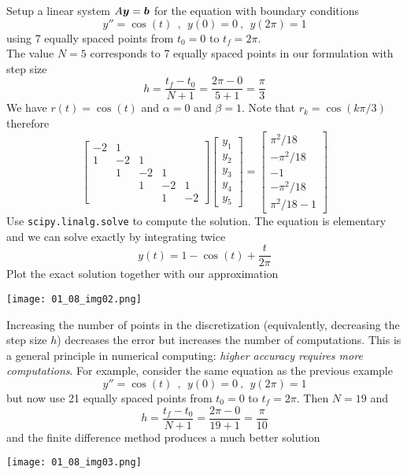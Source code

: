 \begin{example}
Setup a linear system $A \boldsymbol{y} = \boldsymbol{b}$ for the equation with boundary conditions
$$
y'' = \cos(t) \ \ , \ \ y(0) = 0 \ , \ \ y(2\pi) = 1
$$
using 7 equally spaced points from $t_0 = 0$ to $t_f = 2\pi$. \\

The value $N=5$ corresponds to 7 equally spaced points in our formulation with step size
$$
h = \frac{t_f - t_0}{N + 1} = \frac{2\pi - 0}{5 + 1} = \frac{\pi}{3}
$$
We have $r(t) = \cos(t)$ and $\alpha = 0$ and $\beta = 1$. Note that $r_k = \cos(k\pi/3)$ therefore
$$
\left[ \begin{array}{rrrrr}
-2 & 1 & & & \\
1 & -2 & 1 & & \\
& 1 & -2 & 1 & \\
& & 1 & -2 & 1 \\
& & & 1 & -2
\end{array} \right]
\begin{bmatrix} y_1 \\ y_2 \\ y_3 \\ y_4 \\ y_5 \end{bmatrix}
=
\begin{bmatrix} \pi^2/18 \\ -\pi^2/18 \\ -1 \\ -\pi^2/18 \\ \pi^2/18 - 1 \end{bmatrix}
$$
Use {\tt scipy.linalg.solve} to compute the solution. The equation is elementary and we can solve exactly by integrating twice
$$
y(t) = 1 - \cos(t) + \frac{t}{2 \pi}
$$
Plot the exact solution together with our approximation
\begin{center}
\texttt{[image: 01\_08\_img02.png]}
\end{center}
\end{example}

\begin{note}
Increasing the number of points in the discretization (equivalently, decreasing the step size $h$) decreases the error but increases the number of computations. This is a general principle in numerical computing: {\it higher accuracy requires more computations}. For example, consider the same equation as the previous example
$$
y'' = \cos(t) \ \ , \ \ y(0) = 0 \ , \ \ y(2\pi) = 1
$$
but now use 21 equally spaced points from $t_0 = 0$ to $t_f = 2\pi$. Then $N=19$ and
$$
h = \frac{t_f - t_0}{N + 1} = \frac{2\pi - 0}{19 + 1} = \frac{\pi}{10}
$$
and the finite difference method produces a much better solution
\begin{center}
\texttt{[image: 01\_08\_img03.png]}
\end{center}
\end{note}


